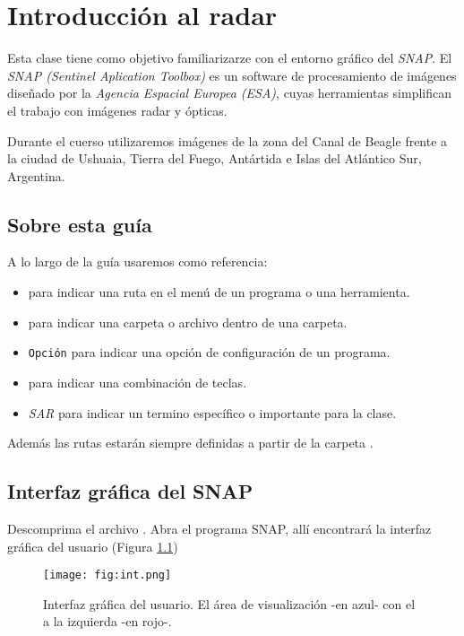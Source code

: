 \chapter{Introducción al radar}

Esta clase tiene como objetivo familiarizarze con el entorno gráfico del \emph{SNAP}. El \emph{SNAP (Sentinel Aplication Toolbox)} es un  software de procesamiento de imágenes diseñado por la \emph{Agencia Espacial Europea (ESA)}, cuyas herramientas simplifican el trabajo con imágenes radar y ópticas.

Durante el cuerso utilizaremos imágenes de la zona del Canal de Beagle frente a la ciudad de Ushuaia, Tierra del Fuego, Antártida e Islas del Atlántico Sur, Argentina.

\section{Sobre esta guía}

A lo largo de la guía usaremos como referencia:

\begin{itemize}
  \item {} para indicar una ruta en el menú de un programa o una herramienta.
  \item {} para indicar una carpeta o archivo dentro de una carpeta.
  \item \texttt{Opción} para indicar una opción de configuración de un programa.
  \item {} para indicar una combinación de teclas.
  \item \emph{SAR} para indicar un termino específico o importante para la clase.
\end{itemize}

Además las rutas estarán siempre definidas a partir de la carpeta .

\section{Interfaz gráfica del SNAP}

Descomprima el archivo . Abra el programa SNAP, allí encontrará la interfaz gráfica del usuario (Figura \ref{fig:int})

\begin{figure}[h!]
    \centering
    \texttt{[image: fig:int.png]}
    \caption{Interfaz gráfica del usuario. El área de visualización -en azul- con el  a la izquierda -en rojo-.}
    \label{fig:int}
\end{figure}

